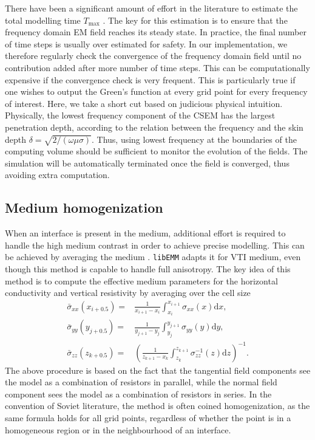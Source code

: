 \documentclass[a4paper,10pt]{article}
\begin{document}
There have been a significant amount of effort in the literature to estimate the total modelling time $T_{\max}$ \citep{wang1993finite,Mittet_2010_HFD}. The key for this estimation is to ensure that the frequency domain EM field reaches its steady state.  In practice, the final number of time steps is usually over estimated for safety. In our implementation, we therefore regularly check the convergence of the  frequency domain field until no contribution added after more number of time steps. This can be computationally expensive if the convergence check is very frequent. This is particularly true if one wishes to output the Green's function at every grid point for every frequency of interest. Here, we take a short cut based on judicious physical intuition. Physically, the lowest frequency component of the CSEM has the largest penetration depth, according to the relation between the frequency and the skin depth $\delta=\sqrt{2/(\omega\mu\sigma)}$. Thus, using lowest frequency at the boundaries of the computing volume should be sufficient to monitor the evolution of the fields. The simulation will be automatically terminated once the field is converged, thus avoiding extra computation.


\subsection{Medium homogenization}

When an interface is present in the medium, additional effort is required to handle the high medium contrast in order to achieve precise modelling. This can be achieved by averaging the medium \citep{davydycheva2003efficient}.  \verb|libEMM| adapts it for VTI medium, even though this method is capable to handle full anisotropy. The key idea of this method is to compute the effective medium parameters for the horizontal conductivity and vertical resistivity by averaging over the cell size
\begin{subequations}
  \begin{align}
\bar{\sigma}_{xx}(x_{i+0.5}) =&\frac{1}{x_{i+1}-x_i} \int_{x_i}^{x_{i+1}}\sigma_{xx}(x)\mathrm{d}x,\\
\bar{\sigma}_{yy}(y_{j+0.5}) =&\frac{1}{y_{j+1}-y_j} \int_{y_j}^{y_{j+1}}\sigma_{yy}(y)\mathrm{d}y,\\
\bar{\sigma}_{zz}(z_{k+0.5}) =&\left(\frac{1}{z_{k+1}-x_k} \int_{z_k}^{z_{k+1}}\sigma_{zz}^{-1}(z)\mathrm{d}z\right)^{-1}.
\end{align}
\end{subequations}
The above procedure is based on the fact that the tangential field components see the model as a combination of resistors in parallel, while the normal field component sees the model as a combination of resistors in series.
In the convention of Soviet literature, the method is often coined homogenization, as 
the same formula holds for all grid points, regardless of whether the point is in a homogeneous region or in the neighbourhood of an interface.
\end{document}
